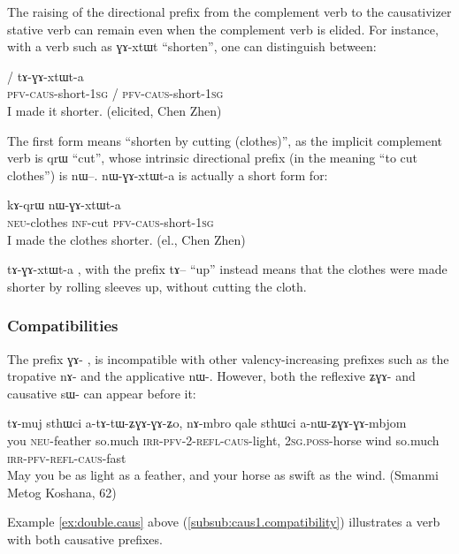\documentclass[oldfontcommands,oneside,a4paper,11pt]{article}
\newcommand{\ipa}[1]{{\phon \mbox{#1}}} %
\newcommand{\sg}{\textsc{sg}}
\newcommand{\pfv}{\textsc{pfv}}
\newcommand{\caus}{\textsc{caus}}
\newcommand{\inftv}{\textsc{inf}}
\newcommand{\irr}{\textsc{irr}}
\newcommand{\neu}{\textsc{neu}}
\newcommand{\poss}{\textsc{poss}}
\newcommand{\refl}{\textsc{refl}}
\begin{document}
   
   The raising of the directional prefix from the complement verb to the causativizer stative verb can remain even when the complement verb is elided. For instance, with a verb such as \ipa{ɣɤ-xtɯt} ``shorten'', one can distinguish between:
   
   \begin{exe}
\ex 
 \gll  	 \ipa{nɯ-ɣɤ-xtɯt-a} / \ipa{tɤ-ɣɤ-xtɯt-a}   	   \\
 \pfv{}-\caus{}-short-1\sg{} / \pfv{}-\caus{}-short-1\sg{} \\
 \glt    I made it shorter. (elicited, Chen Zhen)
   \end{exe}     
   
 The first form means ``shorten by cutting (clothes)'', as the implicit complement verb is \ipa{qrɯ} ``cut'', whose intrinsic directional prefix (in the meaning ``to cut clothes'') is \ipa{nɯ}--.  \ipa{nɯ-ɣɤ-xtɯt-a} is actually a short form for:
 
   \begin{exe}
\ex 
 \gll  	\ipa{tɯ-ŋga} \ipa{kɤ-qrɯ} \ipa{nɯ-ɣɤ-xtɯt-a}  	   \\
 \neu{}-clothes \inftv{}-cut \pfv{}-\caus{}-short-1\sg      \\
 \glt    I made the clothes shorter. (el., Chen Zhen)
   \end{exe}
 \ipa{tɤ-ɣɤ-xtɯt-a} , with the prefix \ipa{tɤ}-- ``up'' instead means that the clothes were made shorter by rolling sleeves up, without cutting the cloth.
 
 
\subsubsection{Compatibilities} \label{subsub:caus2:compat}
The prefix \ipa{ɣɤ-} , is incompatible with other valency-increasing prefixes such as the tropative  \ipa{nɤ-} and the applicative  \ipa{nɯ-}. However, both the reflexive  \ipa{ʑɣɤ-}   and causative  \ipa{sɯ-} can appear before it:
 \begin{exe}
\ex 
\gll \ipa{nɤʑo}  	\ipa{tɤ-muj}  	\ipa{sthɯci}  	\ipa{a-tɤ-tɯ-ʑɣɤ-ɣɤ-ʑo,}  	\ipa{nɤ-mbro}  	\ipa{qale}  	\ipa{sthɯci}  	\ipa{a-nɯ-ʑɣɤ-ɣɤ-mbjom}  	  \\
you \neu{}-feather  so.much \irr{}-\pfv{}-2-\refl-\caus{}-light, 2\sg{}.\poss{}-horse wind so.much \irr{}-\pfv{}-\refl-\caus{}-fast \\
 \glt   May you be as light as a feather, and your horse as swift as the wind. (Smanmi Metog Koshana, 62)
   \end{exe}
Example  \ref{ex:double.caus} above (\ref{subsub:caus1.compatibility}) illustrates a verb with both causative prefixes.
\end{document}
